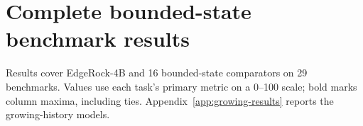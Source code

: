 \clearpage
\section{Complete bounded-state benchmark results}
\label{sec:full-results}
Results cover EdgeRock-4B and 16 bounded-state comparators on 29 benchmarks. Values use each task's primary metric on a 0--100 scale; bold marks column maxima, including ties. Appendix~\ref{app:growing-results} reports the growing-history models.

\BoundedMathResults
\BoundedKnowledgeResults
\FloatBarrier
\BoundedReasoningResults
\BoundedCodeInstructionResults
\FloatBarrier
\BoundedAdditionalResults
\FloatBarrier

